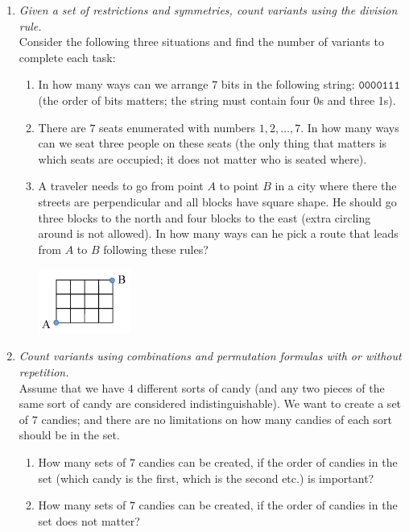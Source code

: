 \documentclass[a4paper,12pt]{article}
\begin{document}
\begin{enumerate}
\item {\small \em Given a set of restrictions and symmetries, count variants using the division rule.}\\
Consider the following three situations and find the number of variants to complete each task:
\begin{enumerate}
\item In how many ways can we arrange $7$ bits in the following string: $\mathtt{0000111}$ (the order of bits matters; 
the string must contain four 0s and three 1s).
\item There are $7$ seats enumerated with numbers $1,2,\ldots,7$. In how many ways can we seat three people on these seats
(the only thing that matters is \textendash{} which seats are occupied; it does not matter who is seated where). 
\item A traveler needs to go from point $A$ to point $B$ in a city where there the streets are perpendicular and 
all blocks have square shape. He should go three blocks to the north and four blocks to the east (extra circling around is
not allowed). In how many ways can he pick a route that leads from $A$ to $B$ following these rules?
\begin{center}
\includegraphics[width=1.2in]{figs/part3-square-city.png}
\end{center}
\end{enumerate}


\item {\small \em Count variants using combinations and permutation formulas with or without repetition.}\\
Assume that we have $4$ different sorts of candy (and any two pieces of the same sort of candy are considered indistinguishable).
We want to create a set of $7$ candies; and there are no limitations on how many candies of each sort should be in the set.
\begin{enumerate}
\item How many sets of $7$ candies can be created, if the order of candies in the set (which candy is the first, which 
is the second etc.) is important? 
\item How many sets of $7$ candies can be created, if the order of candies in the set does not matter?
\end{enumerate}



\end{enumerate}
\end{document}
